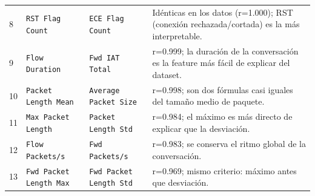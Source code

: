 \begin{longtable}{C{0.6cm} L{3.0cm} L{4.2cm} L{6.3cm}}
8 & \texttt{RST Flag Count} & \texttt{ECE Flag Count} & Idénticas en los datos (r=1.000); RST (conexión rechazada/cortada) es la más interpretable. \\
9 & \texttt{Flow Duration} & \texttt{Fwd IAT Total} & r=0.999; la duración de la conversación es la feature más fácil de explicar del dataset. \\
10 & \texttt{Packet Length Mean} & \texttt{Average Packet Size} & r=0.998; son dos fórmulas casi iguales del tamaño medio de paquete. \\
11 & \texttt{Max Packet Length} & \texttt{Packet Length Std} & r=0.984; el máximo es más directo de explicar que la desviación. \\
12 & \texttt{Flow Packets/s} & \texttt{Fwd Packets/s} & r=0.983; se conserva el ritmo global de la conversación. \\
13 & \texttt{Fwd Packet Length Max} & \texttt{Fwd Packet Length Std} & r=0.969; mismo criterio: máximo antes que desviación. \\
\end{longtable}
